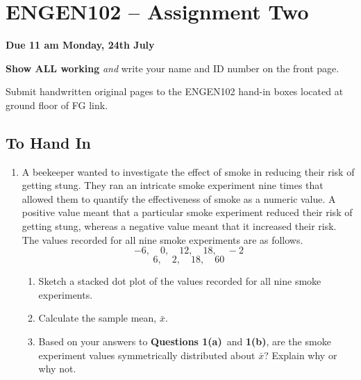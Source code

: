 \documentclass[twoside, 12pt, a4paper]{article}\usepackage[]{graphicx}\usepackage[usenames,dvipsnames]{xcolor}
\begin{document}
\section{ENGEN102 -- Assignment Two}

\textbf{Due 11 am Monday, 24th July}

\textbf{Show ALL working} \textit{and} write your name and ID number on the front page.

Submit handwritten original pages to the ENGEN102 hand-in boxes located at ground floor of FG link. 

\subsection{To Hand In}
\medskip

\begin{enumerate}
  \item A beekeeper wanted to investigate the effect of smoke in reducing their risk of getting stung. They ran an intricate smoke experiment nine times that allowed them to quantify the effectiveness of smoke as a numeric value. A positive value meant that a particular smoke experiment reduced their risk of getting stung, whereas a negative value meant that it increased their risk. \medskip \\ The values recorded for all nine smoke experiments are as follows. \vspace{-6pt}
    \begin{equation*}
      -6, \quad 0, \quad 12, \quad 18, \quad -2
    \end{equation*} \vspace{-18pt}
    \begin{equation*}
      6, \quad 2, \quad 18, \quad 60
    \end{equation*}
  \begin{enumerate}
    \item Sketch a stacked dot plot of the values recorded for all nine smoke experiments.
    \item Calculate the sample mean, $\bar{x}$.
    \item Based on your answers to \textbf{Questions 1(a)}\ and \textbf{1(b)}, are the smoke experiment values symmetrically distributed about $\bar{x}$? Explain why or why not.
  \end{enumerate}
  

\end{enumerate}
\end{document}
